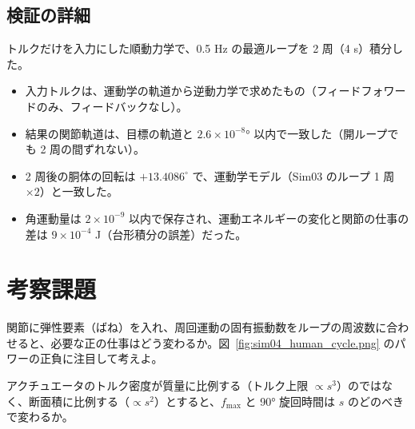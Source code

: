 \subsection{検証の詳細}

トルクだけを入力にした順動力学で、0.5 Hz の最適ループを 2 周（4 s）積分した。
\begin{itemize}
\item 入力トルクは、運動学の軌道から逆動力学で求めたもの（フィードフォワードのみ、フィードバックなし）。
\item 結果の関節軌道は、目標の軌道と $2.6\times10^{-8}$° 以内で一致した（開ループでも 2 周の間ずれない）。
\item 2 周後の胴体の回転は $+13.4086^\circ$ で、運動学モデル（Sim03 のループ 1 周 $\times2$）と一致した。
\item 角運動量は $2\times10^{-9}$ 以内で保存され、運動エネルギーの変化と関節の仕事の差は $9\times10^{-4}$ J（台形積分の誤差）だった。
\end{itemize}

\section*{考察課題}
\begin{exercise}
関節に弾性要素（ばね）を入れ、周回運動の固有振動数をループの周波数に合わせると、必要な正の仕事はどう変わるか。図~\ref{fig:sim04_human_cycle.png} のパワーの正負に注目して考えよ。
\end{exercise}
\begin{exercise}
アクチュエータのトルク密度が質量に比例する（トルク上限 $\propto s^3$）のではなく、断面積に比例する（$\propto s^2$）とすると、$f_{\max}$ と 90° 旋回時間は $s$ のどのべきで変わるか。
\end{exercise}
